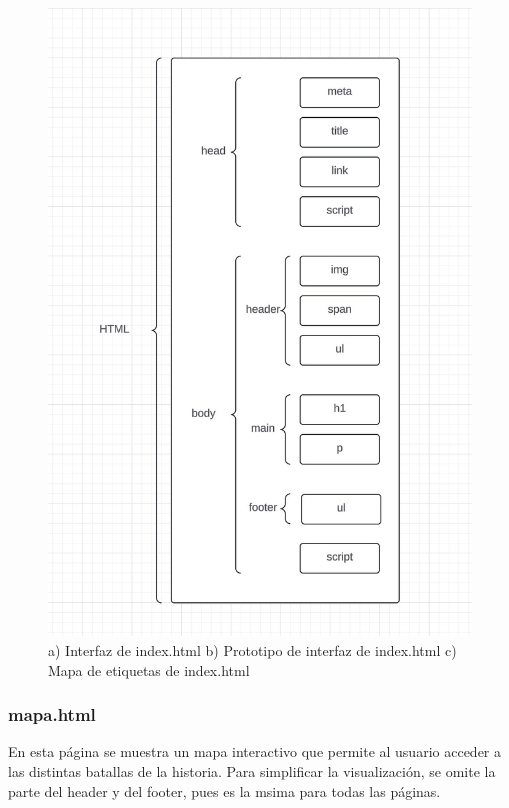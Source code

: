 \documentclass{article}
\begin{document}
\begin{figure}[H]
    \includegraphics[width=\textwidth, height=0.3\textheight, keepaspectratio]{htmlFotos/MEindex.png}
    \caption{a) Interfaz de index.html b) Prototipo de interfaz de index.html c) Mapa de etiquetas de index.html}
    \label{fig:imagenes_conjuntas}
\end{figure}

\newpage

\subsubsection*{mapa.html}

En esta página se muestra un mapa interactivo que permite al usuario acceder a las distintas batallas de la historia. Para simplificar la visualización, se omite la parte del header y del footer, pues es la msima para todas las páginas.
\end{document}
